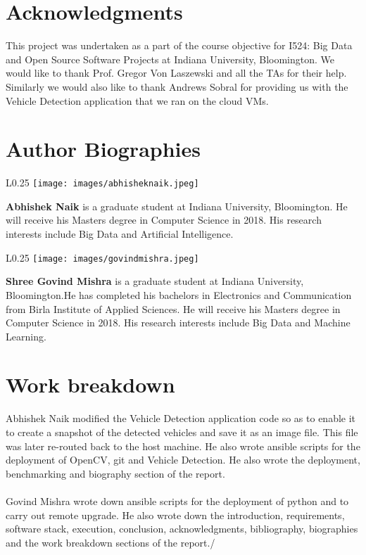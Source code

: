 \documentclass[9pt,twocolumn,twoside]{../../styles/osajnl}
\begin{document}
\section{Acknowledgments}
This project was undertaken as a part of the course objective for
I524: Big Data and Open Source Software Projects at Indiana
University, Bloomington.  We would like to thank Prof. Gregor Von
Laszewski and all the TAs for their help.  Similarly we would also
like to thank Andrews Sobral for providing us with the Vehicle
Detection application that we ran on the cloud VMs.



\section*{Author Biographies}
\begingroup \setlength\intextsep{0pt}
\begin{minipage}[t][3.2cm][t]{1.0\columnwidth}
  \begin{wrapfigure}{L}{0.25\columnwidth}
    \texttt{[image: images/abhisheknaik.jpeg]}
  \end{wrapfigure}
  \noindent
  {\bfseries Abhishek Naik} is a graduate student at Indiana
  University, Bloomington. He will receive his Masters degree in Computer Science in
  2018. His research interests include Big Data and Artificial Intelligence.
\end{minipage}
\begin{minipage}[t][3.2cm][t]{1.0\columnwidth}
  \begin{wrapfigure}{L}{0.25\columnwidth}
    \texttt{[image: images/govindmishra.jpeg]}
  \end{wrapfigure}
  \noindent
  {\bfseries Shree Govind Mishra} is a graduate student at Indiana
  University, Bloomington.He has completed his bachelors in
  Electronics and Communication from Birla Institute of Applied
  Sciences. He will receive his Masters degree in Computer Science in
  2018. His research interests include Big Data and Machine Learning.
\end{minipage}
\endgroup \appendix

\section{Work breakdown}
Abhishek Naik modified the Vehicle Detection application code so as to
enable it to create a snapshot of the detected vehicles and save it as
an image file.  This file was later re-routed back to the host
machine.  He also wrote ansible scripts for the deployment of OpenCV,
git and Vehicle Detection.  He also wrote the deployment, benchmarking
and biography section of the report.\\ \\  Govind Mishra wrote down
ansible scripts for the deployment of python and to carry out remote
upgrade.  He also  wrote down the introduction, requirements,
software stack, execution, conclusion, acknowledgments, bibliography,
biographies and the work breakdown sections of the report./
\end{document}
